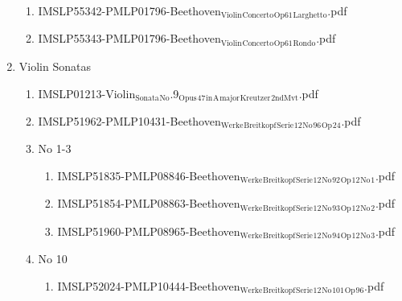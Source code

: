 \documentclass[11pt]{article}
\begin{document}
\begin{enumerate}
\begin{enumerate}
\item IMSLP55342-PMLP01796-Beethoven$_{\text{Violin}}$$_{\text{Concerto}}$$_{\text{Op61}}$$_{\text{Larghetto}}$.pdf
\label{sec-1-1-1-1-44-9-11-2}

\item IMSLP55343-PMLP01796-Beethoven$_{\text{Violin}}$$_{\text{Concerto}}$$_{\text{Op61}}$$_{\text{Rondo}}$.pdf
\label{sec-1-1-1-1-44-9-11-3}
\end{enumerate}

\item Violin Sonatas
\label{sec-1-1-1-1-44-9-12}
\begin{enumerate}
\item IMSLP01213-Violin$_{\text{Sonata}}$$_{\text{No}}$.9$_{\text{Opus}}$$_{\text{47}}$$_{\text{in}}$$_{\text{A}}$$_{\text{major}}$$_{\text{Kreutzer}}$$_{\text{2ndMvt}}$.pdf
\label{sec-1-1-1-1-44-9-12-1}

\item IMSLP51962-PMLP10431-Beethoven$_{\text{Werke}}$$_{\text{Breitkopf}}$$_{\text{Serie}}$$_{\text{12}}$$_{\text{No}}$$_{\text{96}}$$_{\text{Op}}$$_{\text{24}}$.pdf
\label{sec-1-1-1-1-44-9-12-2}

\item No 1-3
\label{sec-1-1-1-1-44-9-12-3}
\begin{enumerate}
\item IMSLP51835-PMLP08846-Beethoven$_{\text{Werke}}$$_{\text{Breitkopf}}$$_{\text{Serie}}$$_{\text{12}}$$_{\text{No}}$$_{\text{92}}$$_{\text{Op}}$$_{\text{12}}$$_{\text{No}}$$_{\text{1}}$.pdf
\label{sec-1-1-1-1-44-9-12-3-1}

\item IMSLP51854-PMLP08863-Beethoven$_{\text{Werke}}$$_{\text{Breitkopf}}$$_{\text{Serie}}$$_{\text{12}}$$_{\text{No}}$$_{\text{93}}$$_{\text{Op}}$$_{\text{12}}$$_{\text{No}}$$_{\text{2}}$.pdf
\label{sec-1-1-1-1-44-9-12-3-2}

\item IMSLP51960-PMLP08965-Beethoven$_{\text{Werke}}$$_{\text{Breitkopf}}$$_{\text{Serie}}$$_{\text{12}}$$_{\text{No}}$$_{\text{94}}$$_{\text{Op}}$$_{\text{12}}$$_{\text{No}}$$_{\text{3}}$.pdf
\label{sec-1-1-1-1-44-9-12-3-3}
\end{enumerate}

\item No 10
\label{sec-1-1-1-1-44-9-12-4}
\begin{enumerate}
\item IMSLP52024-PMLP10444-Beethoven$_{\text{Werke}}$$_{\text{Breitkopf}}$$_{\text{Serie}}$$_{\text{12}}$$_{\text{No}}$$_{\text{101}}$$_{\text{Op}}$$_{\text{96}}$.pdf
\label{sec-1-1-1-1-44-9-12-4-1}
\end{enumerate}


\end{enumerate}
\end{enumerate}
\end{document}
